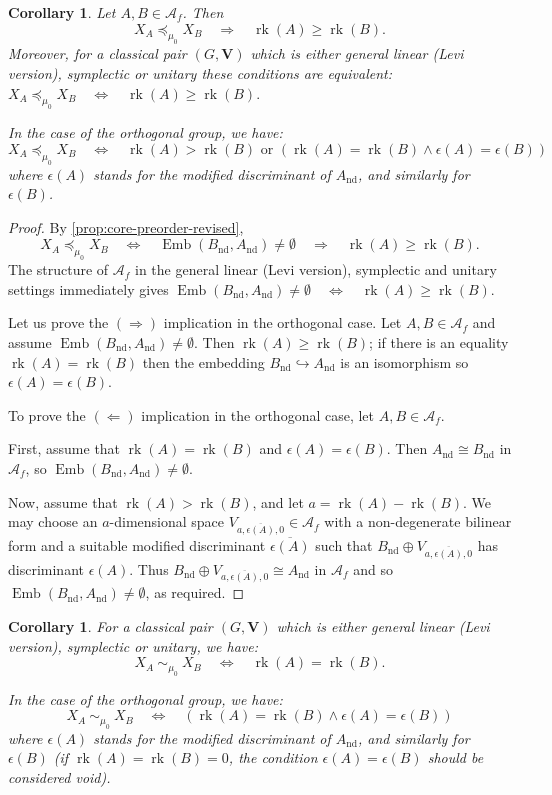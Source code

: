 \documentclass[11pt,a4paper]{amsart}
\theoremstyle{plain}%
\newtheorem{corollary}[lemma]{Corollary}
\theoremstyle{definition}
\theoremstyle{remark}
\newcommand{\rk}{{\operatorname{rk}}}
\newcommand{\V}{\mathbf{V}}
\newcommand{\Emb}{\operatorname{Emb}}
\newcommand{\nd}{\mathrm{nd}}
\begin{document}
\begin{corollary}\label{cor:poset_P_mu_0}
    Let $A, B\in \mathcal{A}_f$.
Then
\[
 X_A\preceq_{\mu_0}X_B
 \quad\Longrightarrow\quad
 \rk(A)\geq \rk(B).
\] Moreover, for a classical pair $(G, \V)$ which is either general linear (Levi version), symplectic or unitary these conditions are equivalent: $ X_A\preceq_{\mu_0}X_B
 \quad\Longleftrightarrow\quad
 \rk(A)\geq \rk(B).$

 
In the case of the orthogonal group, we have: \[X_A\preceq_{\mu_0}X_B
 \quad\Longleftrightarrow\quad
     \rk(A)> \rk(B) \text{ or } \left(\rk(A)=\rk(B) \wedge\epsilon(A)=\epsilon(B)\right)\]
     where $\epsilon(A)$ stands for the modified discriminant of $A_{\nd}$, and similarly for $\epsilon(B)$.
\end{corollary}
\begin{proof}
    By \cref{prop:core-preorder-revised}, \[
 X_A\preceq_{\mu_0}X_B \quad\Longleftrightarrow\quad
 \Emb(B_{\nd}, A_{\nd})\neq \emptyset
 \quad\Longrightarrow\quad
 \rk(A)\geq \rk(B).
\]  The structure of $\mathcal{A}_f$ in the general linear (Levi version), symplectic and unitary settings immediately gives $ \Emb(B_{\nd}, A_{\nd})\neq \emptyset
 \quad\Longleftrightarrow\quad
 \rk(A)\geq \rk(B)$.
 
 Let us prove the $(\Rightarrow)$ implication in the orthogonal case. Let $A, B\in \mathcal{A}_f$ and assume $\Emb(B_{\nd}, A_{\nd})\neq \emptyset$. Then $ \rk(A)\geq \rk(B)$; if there is an equality $ \rk(A)= \rk(B)$ then the embedding $ B_{\nd}\hookrightarrow A_{\nd}$ is an isomorphism so $\epsilon(A)=\epsilon(B)$.

 To prove the $(\Leftarrow)$ implication in the orthogonal case, let $A, B\in \mathcal{A}_f$.
 
 First, assume that $\rk(A)=\rk(B) $ and $\epsilon(A)=\epsilon(B)$. Then $A_{\nd}\cong B_{\nd}$ in $\mathcal{A}_f$, so $ \Emb(B_{\nd}, A_{\nd})\neq \emptyset$.

 Now, assume that $\rk(A)>\rk(B) $, and let $a=\rk(A)-\rk(B)$. We may choose an $a$-dimensional space $V_{a,\overline{\epsilon(A)}, 0} \in \mathcal{A}_f$ with a non-degenerate bilinear form and a suitable modified discriminant $\overline{\epsilon(A)}$ such that $B_{\nd}\oplus  V_{a,\overline{\epsilon(A)}, 0}$ has discriminant $\epsilon(A)$. Thus $ B_{\nd}\oplus  V_{a,\overline{\epsilon(A)}, 0}\cong A_{\nd}$ in $\mathcal{A}_f$ and so $ \Emb(B_{\nd}, A_{\nd})\neq \emptyset$, as required.
\end{proof}
\begin{corollary}\label{cor:equiv_classes_mu_0}
   For a classical pair $(G, \V)$ which is either general linear (Levi version), symplectic or unitary, we have: $$ X_A~\sim_{\mu_0}~X_B
 \quad\Longleftrightarrow\quad
 \rk(A)= \rk(B).$$

 
In the case of the orthogonal group, we have: \[X_A~\sim_{\mu_0}~X_B
 \quad\Longleftrightarrow\quad \left(\rk(A)=\rk(B) \wedge\epsilon(A)=\epsilon(B)\right)\]
     where $\epsilon(A)$ stands for the modified discriminant of $A_{\nd}$, and similarly for $\epsilon(B)$ (if $\rk(A)=\rk(B)=0$, the condition $\epsilon(A)=\epsilon(B)$ should be considered void).
\end{corollary}
\end{document}
